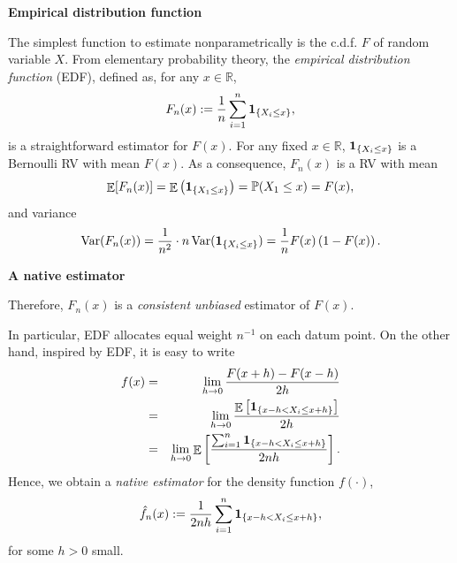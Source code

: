\documentclass[19pt,landscaoe]{article}
\newcommand{\IP}{\mathbb{P}}
\newcommand{\bone}{{\bf 1}}
\DeclareMathOperator{\E}{\mathbb{E}}
\newcommand{\R}{\mathbb{R}}
\DeclareMathOperator{\Var}{\mathrm{Var}}
\begin{document}
\newpage
{\LARGE\centerline{\textbf{Empirical distribution function}}}
\vskip25pt
\begin{minipage}{.9\textwidth}
    \Large The simplest function to estimate nonparametrically is the c.d.f. $F$ of random variable $X$. 
From elementary probability theory, the {\it empirical distribution function} (EDF), defined as, for any $x\in\R$, 
\begin{equation}
    F_n(x):=\frac1n\sum_{i=1}^n\bone_{\{X_i\le x\}},
\end{equation}
is a straightforward estimator for $F(x)$. 
\vskip 5pt
For any fixed $x\in\R$, $\bone_{\{X_i\le x\}}$ is a Bernoulli RV with mean $F(x)$. As a consequence, $F_n(x)$ is a RV with mean 
\begin{equation*}
    \E[F_n(x)]=\E\left(\bone_{\{X_1\le x\}}\right)=\IP(X_1\le x)=F(x),
\end{equation*}
and variance 
\begin{equation*}
    \Var(F_n(x))=\frac1{n^2}\cdot n\Var(\bone_{\{X_i\le x\}})=\frac1nF(x)\left(1-F(x)\right).
\end{equation*}
\end{minipage}

\newpage
{\LARGE\centerline{\textbf{A native estimator}}}
\vskip25pt
\begin{minipage}{.9\textwidth}
    \Large 
    Therefore, $F_n(x)$ is a {\it consistent unbiased} estimator of $F(x)$. 

    \vskip 5pt
    In particular, EDF allocates equal weight $n^{-1}$ on each datum point.
    \vskip 5pt
    On the other hand, inspired by EDF, it is easy to write 
    \begin{eqnarray*}
        f(x)&=&\lim_{h\to0}\frac{F(x+h)-F(x-h)}{2h}\\
        &=&\lim_{h\to0}\frac{\E\left[\bone_{\{x-h<X_i\le x+h\}}\right]}{2h}\\
        &=&\lim_{h\to0}\E\left[\frac{\sum_{i=1}^n\bone_{\{x-h<X_i\le x+h\}}}{2nh}\right].
    \end{eqnarray*}
    Hence, we obtain a {\it native estimator} for the density function $f(\cdot)$, 
\begin{equation}\label{def-nat}
    \hat{f}_n(x):=\frac1{2nh}\sum_{i=1}^n\bone_{\{x-h<X_i\le x+h\}},
\end{equation}
    for some $h>0$ small. 
\end{minipage}
\end{document}
